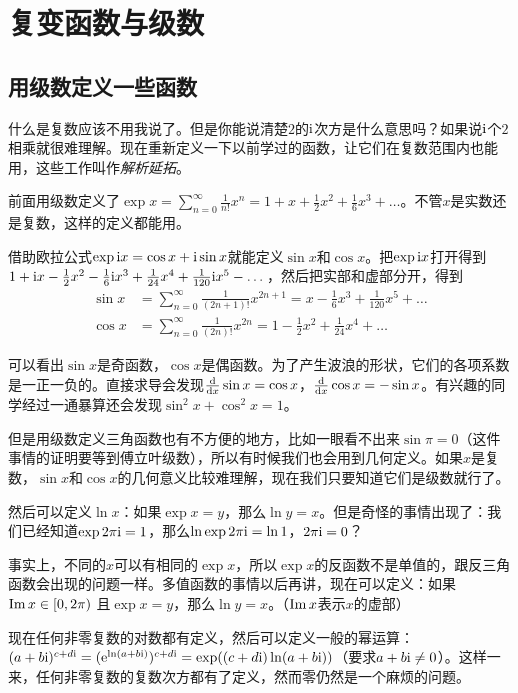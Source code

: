 \chapter{复变函数与级数}
\section{用级数定义一些函数}
什么是复数应该不用我说了。但是你能说清楚$2$的$\mathrm{i}$次方是什么意思吗？如果说$\mathrm{i}$个$2$相乘就很难理解。现在重新定义一下以前学过的函数，让它们在复数范围内也能用，这些工作叫作\emph{解析延拓}。

前面用级数定义了$\exp x=\sum_{n=0}^{\infty}\frac{1}{n!}x^n=1+x+\frac{1}{2}x^2+\frac{1}{6}x^3+\dots$。不管$x$是实数还是复数，这样的定义都能用。

借助欧拉公式$\exp \mathrm{i} x=\cos x+\mathrm{i} \sin x$就能定义$\sin x$和$\cos x$。把$\exp \mathrm{i} x$打开得到$1+\mathrm{i} x-\frac{1}{2}x^2-\frac{1}{6} \mathrm{i} x^3+\frac{1}{24} x^4+\frac{1}{120} \mathrm{i} x^5-\dots$，然后把实部和虚部分开，得到
\begin{align*}
\sin x&=\sum_{n=0}^{\infty}\frac{1}{(2n+1)!}x^{2n+1}=x-\frac{1}{6}x^3+\frac{1}{120}x^5+\dots \\
\cos x&=\sum_{n=0}^{\infty}\frac{1}{(2n)!}x^{2n}=1-\frac{1}{2}x^2+\frac{1}{24}x^4+\dots
\end{align*}

可以看出$\sin x$是奇函数，$\cos x$是偶函数。为了产生波浪的形状，它们的各项系数是一正一负的。直接求导会发现$\frac{\mathop{}\!\mathrm{d}}{\mathop{}\!\mathrm{d} x} \sin x=\cos x$，$\frac{\mathop{}\!\mathrm{d}}{\mathop{}\!\mathrm{d} x} \cos x=-\sin x$。有兴趣的同学经过一通暴算还会发现$\sin^2 x+\cos^2 x=1$。

但是用级数定义三角函数也有不方便的地方，比如一眼看不出来$\sin \pi=0$（这件事情的证明要等到傅立叶级数），所以有时候我们也会用到几何定义。如果$x$是复数，$\sin x$和$\cos x$的几何意义比较难理解，现在我们只要知道它们是级数就行了。

然后可以定义$\ln x$：如果$\exp x=y$，那么$\ln y=x$。但是奇怪的事情出现了：我们已经知道$\exp 2 \pi \mathrm{i}=1$，那么$\ln \exp 2 \pi \mathrm{i}=\ln 1$，$2 \pi \mathrm{i}=0$？

事实上，不同的$x$可以有相同的$\exp x$，所以$\exp x$的反函数不是单值的，跟反三角函数会出现的问题一样。多值函数的事情以后再讲，现在可以定义：如果$\mathrm{Im}\mathop{}\! x \in [0,2\pi)$ 且$\exp x=y$，那么$\ln y=x$。（$\mathrm{Im}\mathop{}\! x$表示$x$的虚部）

现在任何非零复数的对数都有定义，然后可以定义一般的幂运算：$(a+b \mathrm{i})^{c+d \mathrm{i}}=(\mathrm{e}^{\ln(a+b \mathrm{i})})^{c+d \mathrm{i}}=\exp((c+d \mathrm{i})\ln(a+b \mathrm{i}))$（要求$a+b \mathrm{i} \neq 0$）。这样一来，任何非零复数的复数次方都有了定义，然而零仍然是一个麻烦的问题。

